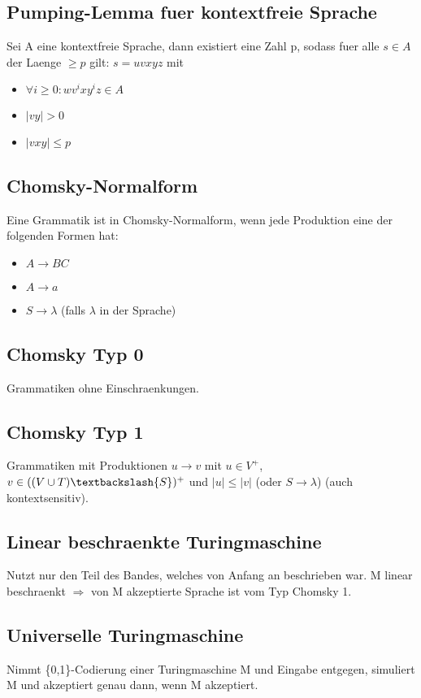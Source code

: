 \documentclass[a4paper]{scrreprt}
\begin{document}
\subsection{Pumping-Lemma fuer kontextfreie Sprache}
Sei A eine kontextfreie Sprache, dann existiert eine Zahl p, sodass fuer alle $s \in A$ der Laenge $\ge p$ gilt: $s = uvxyz$ mit
\begin{itemize}
	\item $\forall i \ge 0: wv^ixy^iz \in A$
	\item $|vy| > 0$
	\item $|vxy| \le p$
\end{itemize}

\subsection{Chomsky-Normalform}
Eine Grammatik ist in Chomsky-Normalform, wenn jede Produktion eine der folgenden Formen hat:
\begin{itemize}
	\item $A \rightarrow BC$
	\item $A \rightarrow a$
	\item $S \rightarrow \lambda$ (falls $\lambda$ in der Sprache)
\end{itemize}

\subsection{Chomsky Typ 0}
Grammatiken ohne Einschraenkungen.

\subsection{Chomsky Typ 1}
Grammatiken mit Produktionen $u \rightarrow v$ mit $u \in V^+$, $v \in ((V \cup T) \textbackslash \{S\})^+$ und $|u| \le |v|$ (oder $S \rightarrow \lambda$) (auch kontextsensitiv).

\subsection{Linear beschraenkte Turingmaschine}
Nutzt nur den Teil des Bandes, welches von Anfang an beschrieben war. M linear beschraenkt $\Rightarrow$ von M akzeptierte Sprache ist vom Typ Chomsky 1.

\subsection{Universelle Turingmaschine}
Nimmt \{0,1\}-Codierung einer Turingmaschine M und Eingabe entgegen, simuliert M und akzeptiert genau dann, wenn M akzeptiert.
\end{document}
